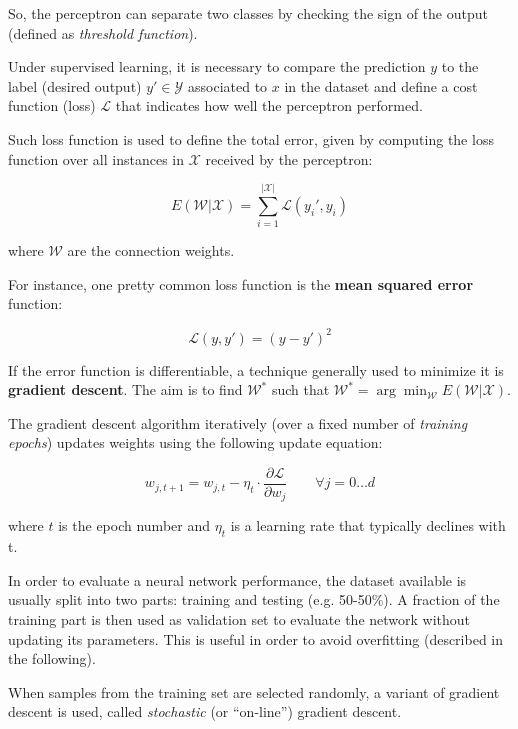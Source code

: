 So, the perceptron can separate two classes by checking the sign of the output (defined as \textit{threshold function}).

Under supervised learning, it is necessary to compare the prediction $y$ to the label (desired output) $y' \in \mathcal{Y}$ associated to $x$ in the dataset and define a cost function (loss) $\mathcal{L}$ that indicates how well the perceptron performed.

Such loss function is used to define the total error, given by computing the loss function over all instances in $\mathcal{X}$ received by the perceptron:

\begin{equation}
E(\mathcal{W}| \mathcal{X}) = \sum_{i = 1}^{|\mathcal{X}|} \mathcal{L}(y_i', y_i)
\end{equation}

where $\mathcal{W}$ are the connection weights.

For instance, one pretty common loss function is the \textbf{mean squared error} function:

\begin{equation}
    \mathcal{L}(y, y') = (y - y')^2
\end{equation}

If the error function is differentiable, a technique generally used to minimize it is \textbf{gradient descent}. The aim is to find $\mathcal{W}^*$ such that $\mathcal{W}^* = \arg \min_{\mathcal{W}} E(\mathcal{W}| \mathcal{X})$.

The gradient descent algorithm iteratively (over a fixed number of \textit{training epochs}) updates weights using the following update equation:

\begin{equation}
\tag{gradient descent}
w_{j, t+1} = w_{j,t} - \eta_t \cdot \frac{ \partial \mathcal{L}}{\partial w_j} \qquad \forall j=0 \dots d
\end{equation}

where $t$ is the epoch number and $\eta_t$ is a learning rate that typically declines with t.

In order to evaluate a neural network performance, the dataset available is usually split into two parts: training and testing (e.g. 50-50\%). A fraction of the training part is then used as validation set to evaluate the network without updating its parameters. This is useful in order to avoid overfitting (described in the following).

When samples from the training set are selected randomly, a variant of gradient descent is used, called \textit{stochastic} (or ``on-line'') gradient descent.

